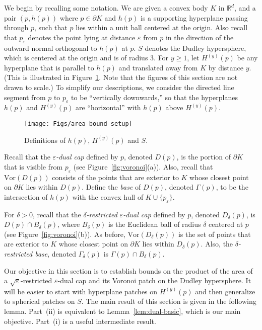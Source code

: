 \documentclass[11pt]{article}   \usepackage[letterpaper,hmargin=2.1cm,vmargin=3cm]{geometry}
\newcommand{\RE}{\mathbb{R}}    \newcommand{\ZZ}{\mathbb{Z}}    \newcommand{\eps}{\varepsilon}  \newcommand{\ST}{\,:\,}         \newcommand{\sq}{\square}
\newcommand{\Vor}{\mathrm{Vor}}
\begin{document}
We begin by recalling some notation. We are given a convex body $K$ in $\RE^d$, and a pair $(p,h(p))$ where $p \in \partial K$ and $h(p)$ is a supporting hyperplane passing through $p$, such that $p$ lies within a unit ball centered at the origin. Also recall that $p_{\eps}$ denotes the point lying at distance $\eps$ from $p$ in the direction of the outward normal orthogonal to $h(p)$ at $p$. $S$ denotes the Dudley hypersphere, which is centered at the origin and is of radius $3$. For $y \ge 1$, let $H^{(y)}(p)$ be any hyperplane that is parallel to $h(p)$ and translated away from $K$ by distance $y$. (This is illustrated in Figure~\ref{fig:area-bound-setup}. Note that the figures of this section are not drawn to scale.) To simplify our descriptions, we consider the directed line segment from $p$ to $p_{\eps}$ to be ``vertically downwards,'' so that the hyperplanes $h(p)$ and $H^{(y)}(p)$ are ``horizontal'' with $h(p)$ above $H^{(y)}(p)$.

\begin{figure}[htbp]
  \centerline{\texttt{[image: Figs/area-bound-setup]}}
  \caption{Definitions of $h(p)$, $H^{(y)}(p)$ and $S$.}
  \label{fig:area-bound-setup}
\end{figure}


Recall that the \emph{$\eps$-dual cap} defined by $p$, denoted $D(p)$, is the portion of $\partial K$ that is visible from $p_{\eps}$ (see Figure~\ref{fig:voronoi}(a)). Also, recall that $\Vor(D(p))$ consists of the points that are exterior to $K$ whose closest point on $\partial K$ lies within $D(p)$. Define the \emph{base} of $D(p)$, denoted $\Gamma(p)$, to be the intersection of $h(p)$ with the convex hull of $K \cup \{p_{\eps}\}$. 

For $\delta > 0$, recall that the \emph{$\delta$-restricted $\eps$-dual cap} defined by $p$, denoted $D_{\delta}(p)$, is $D(p) \cap B_{\delta}(p)$, where $B_{\delta}(p)$ is the Euclidean ball of radius $\delta$ centered at $p$ (see Figure~\ref{fig:voronoi}(b)). As before, $\Vor(D_{\delta}(p))$ is the set of points that are exterior to $K$ whose closest point on $\partial K$ lies within $D_{\delta}(p)$. Also, the \emph{$\delta$-restricted base}, denoted $\Gamma_{\delta}(p)$ is $\Gamma(p) \cap B_{\delta}(p)$.

Our objective in this section is to establish bounds on the product of the area of a $\sqrt{\eps}$-restricted $\eps$-dual cap and its Voronoi patch on the Dudley hypersphere. It will be easier to start with hyperplane patches on $H^{(y)}(p)$ and then generalize to spherical patches on $S$. The main result of this section is given in the following lemma. Part~(ii) is equivalent to Lemma~\ref{lem:dual-basic}, which is our main objective. Part~(i) is a useful intermediate result.
\end{document}
